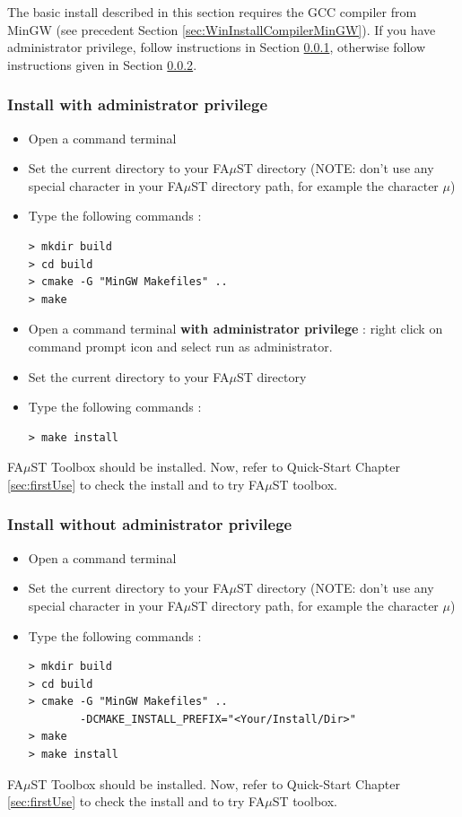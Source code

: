 The basic install described in this section requires the GCC compiler from MinGW (see precedent Section \ref{sec:WinInstallCompilerMinGW}).
If you have administrator privilege, follow instructions in Section \ref{sec:WinMinGWadminBasicInstall}, otherwise follow instructions given in Section \ref{sec:WinMinGWNoAdminBasicInstall}.
\subsubsection{Install with administrator privilege}
\label{sec:WinMinGWadminBasicInstall}

\begin{itemize}
\item Open a command terminal
\item Set the current directory to your FA$\mu$ST directory (NOTE: don't use any special character in your FA$\mu$ST directory path, for example the character $\mu$)
\item Type the following commands : 

\lstset{style=customBash}
\begin{lstlisting}
> mkdir build
> cd build
> cmake -G "MinGW Makefiles" .. 
> make
\end{lstlisting}

\item Open a command terminal \textbf{with administrator privilege} : right click on command prompt icon and select run as administrator. 
\item Set the current directory to your FA$\mu$ST directory
\item Type the following commands : 
\begin{lstlisting}
> make install 
\end{lstlisting}
\end{itemize}

FA$\mu$ST Toolbox should be installed. Now, refer to Quick-Start Chapter \ref{sec:firstUse} to check the install and to try FA$\mu$ST toolbox.


\subsubsection{Install without administrator privilege}
\label{sec:WinMinGWNoAdminBasicInstall}

\begin{itemize}
\item Open a command terminal
\item Set the current directory to your FA$\mu$ST directory (NOTE: don't use any special character in your FA$\mu$ST directory path, for example the character $\mu$)
\item Type the following commands : 

\lstset{style=customBash}
\begin{lstlisting}
> mkdir build
> cd build
> cmake -G "MinGW Makefiles" .. 
	    -DCMAKE_INSTALL_PREFIX="<Your/Install/Dir>"
> make
> make install 
\end{lstlisting}

\end{itemize}
FA$\mu$ST Toolbox should be installed. Now, refer to Quick-Start Chapter \ref{sec:firstUse} to check the install and to try FA$\mu$ST toolbox.

